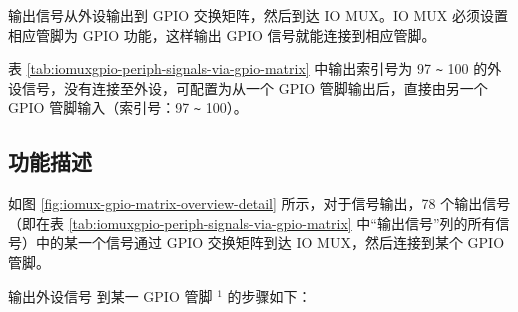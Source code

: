 \documentclass[main\_\_CN.tex]{subfiles}
\begin{document}
输出信号从外设输出到 GPIO 交换矩阵，然后到达 IO MUX。IO MUX 必须设置相应管脚为 GPIO 功能，这样输出 GPIO 信号就能连接到相应管脚。

\begin{tiplisting}
表 \ref{tab:iomuxgpio-periph-signals-via-gpio-matrix} 中输出索引号为 97 \verb+~+ 100 的外设信号，没有连接至外设，可配置为从一个 GPIO 管脚输出后，直接由另一个 GPIO 管脚输入（索引号：97 \verb+~+ 100）。
\end{tiplisting}
\vspace{-2em}
\subsection{功能描述}\label{IOMUXPeripheralOutput}

如图 \ref{fig:iomux-gpio-matrix-overview-detail} 所示，对于信号输出，78 个输出信号（即在表 \ref{tab:iomuxgpio-periph-signals-via-gpio-matrix} 中“输出信号”列的所有信号）中的某一个信号通过 GPIO 交换矩阵到达 IO MUX，然后连接到某个 GPIO 管脚。

输出外设信号  到某一 GPIO 管脚 \hyperref[output-note-1]{$^1$} 的步骤如下：
\end{document}

